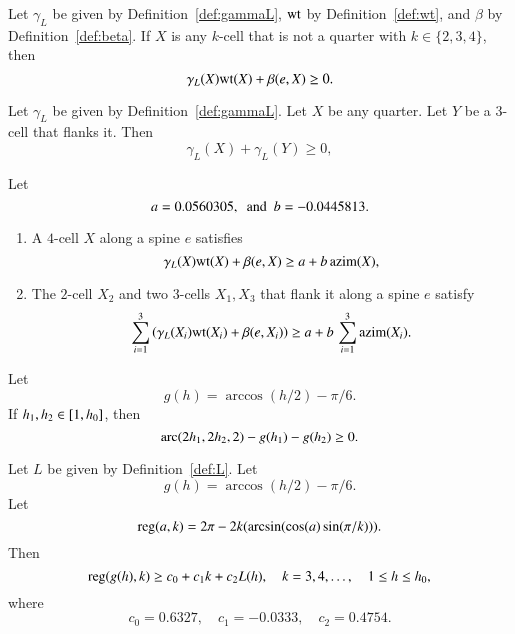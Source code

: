 \begin{calculation}\label{calc:cc:qtr}
Let $\gamma_L$ be given by Definition~\ref{def:gammaL}, ${\operatorname{wt}}$ by
Definition~\ref{def:wt}, and $\beta$ by Definition~\ref{def:beta}.
If $X$ is any $k$-cell that is not a quarter with $k\in\{2,3,4\}$,
then %
\[ 
\gamma_L(X) {\operatorname{wt}}(X) + \beta(e,X)\ge 0.
\]  
\end{calculation}

\begin{calculation}\label{calc:cc:2bl}
Let $\gamma_L$ be given by Definition~\ref{def:gammaL}.  Let $X$ be
any quarter.  Let $Y$ be a $3$-cell that flanks it.  Then
\[ 
\gamma_L(X)+\gamma_L(Y)\ge 0,
\] 
\end{calculation}

\begin{calculation}\label{calc:cc:5bl}
Let
\[ 
a= 0.0560305, \text{ \ and \ }   b= -0.0445813.
\] 
\begin{enumerate}\wasitemize 
\item {} A $4$-cell $X$ along a spine $e$ satisfies
\[ 
\gamma_L(X){\operatorname{wt}}(X) + \beta(e,X) \ge a + b\,{\operatorname{azim}}(X),
\] 
\item {} The $2$-cell $X_2$ and two $3$-cells $X_1,X_3$
that flank it along a spine $e$ satisfy
\[ 
\sum_{i=1}^3 \left(\gamma_L(X_i){\operatorname{wt}}(X_i) + \beta(e,X_i)\right)\ge a + b\,\sum_{i=1}^3{\operatorname{azim}}(X_i).
\] 
\end{enumerate}\wasitemize 
\end{calculation}

\begin{calculation}\label{calc:cc:disks} 
Let
\[ 
g(h) = \arccos(h/2) - \pi/6.
\] 
If $h_1,h_2\in [1,{h_0}]$, then
\[ 
{\operatorname{arc}}(2h_1,2h_2,2) - g(h_1) - g(h_2)\ge 0.
\] 
\end{calculation}

\begin{calculation}\label{calc:cc:alin}
Let $L$ be given by Definition~\ref{def:L}.
Let
\[ 
g(h) = \arccos(h/2) - \pi/6.
\] 
Let
\[ 
{\operatorname{reg}}(a,k) = 2\pi - 2 k (\arcsin(\cos(a)\sin(\pi/k))).
\] 
Then
\[ 
{\operatorname{reg}}(g(h),k) \ge c_0 + c_1 k + c_2 L(h),\quad
k = 3,4,\ldots,\quad 1\le h\le {h_0},
\] 
where
\[ c_0 = 0.6327,\quad c_1 = -0.0333,\quad c_2 =
0.4754.\] 
\end{calculation}

